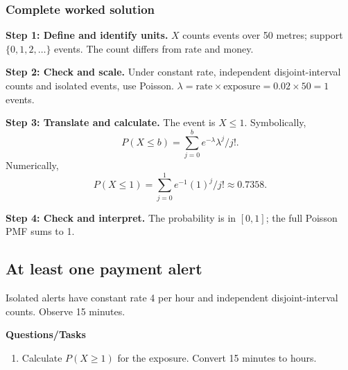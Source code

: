 \subsubsection*{Complete worked solution}
\par\noindent\begin{minipage}{\linewidth}
\textbf{Step 1: Define and identify units.} $X$ counts events over 50 metres; support $\{0,1,2,\ldots\}$ events. The count differs from rate and money.
\end{minipage}\par\medskip
\par\noindent\begin{minipage}{\linewidth}
\textbf{Step 2: Check and scale.} Under constant rate, independent disjoint-interval counts and isolated events, use Poisson. $\lambda=\text{rate}\times\text{exposure}=0.02\times50=1$ events.
\end{minipage}\par\medskip
\par\noindent\begin{minipage}{\linewidth}
\textbf{Step 3: Translate and calculate.} The event is $ X\leq1$. Symbolically,
\[P(X\leq b)=\sum_{j=0}^{b}e^{-\lambda}\lambda^j/j!.\]
Numerically,
\[P(X\leq1)=\sum_{j=0}^{1} e^{-1}(1)^j/j!\approx 0.7358.\]
\end{minipage}\par\medskip
\par\noindent\begin{minipage}{\linewidth}
\textbf{Step 4: Check and interpret.} The probability is in $[0,1]$; the full Poisson PMF sums to 1. 
\end{minipage}\par\medskip
{}
\subsection{At least one payment alert}
Isolated alerts have constant rate 4 per hour and independent disjoint-interval counts. Observe 15 minutes.

\textbf{Questions/Tasks}
\begin{enumerate}
\item Calculate $P(X\geq1)$ for the exposure. Convert 15 minutes to hours.
\end{enumerate}

